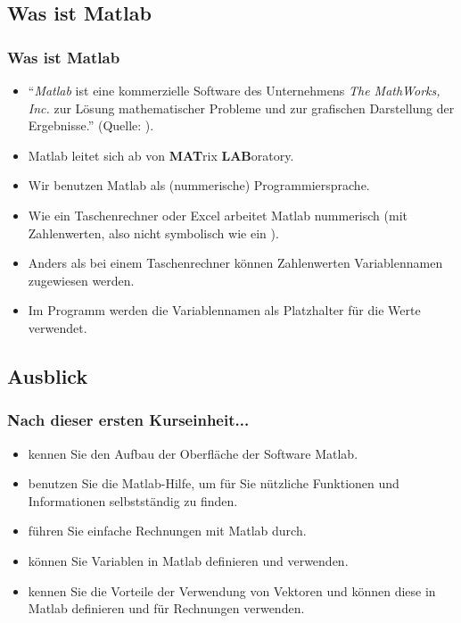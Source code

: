     \subsection{Was ist Matlab}
    \begin{frame}
        \frametitle{Was ist Matlab}

        \begin{itemize}
          \item ``\emph{Matlab} ist eine kommerzielle Software des Unternehmens \emph{The MathWorks, Inc.} zur Lösung mathematischer Probleme
          und zur grafischen Darstellung der Ergebnisse.'' (Quelle: ).
          \item Matlab leitet sich ab von \textbf{MAT}rix \textbf{LAB}oratory.
          \item Wir benutzen Matlab als (nummerische) Programmiersprache.
          \item Wie ein Taschenrechner oder Excel arbeitet Matlab nummerisch (mit Zahlenwerten, also nicht symbolisch wie
          ein ).
          \item Anders als bei einem Taschenrechner können Zahlenwerten Variablennamen zugewiesen werden.
          \item Im Programm werden die Variablennamen als Platzhalter für die Werte verwendet.
        \end{itemize}
    \end{frame}

    \subsection{Ausblick}
    \begin{frame}
        \frametitle{Nach dieser ersten Kurseinheit...}

        \begin{itemize}
          \itemsep0.3cm
          \item kennen Sie den Aufbau der Oberfläche der Software Matlab.
          \item benutzen Sie die Matlab-Hilfe, um für Sie nützliche Funktionen und Informationen selbstständig zu finden.
          \item führen Sie einfache Rechnungen mit Matlab durch.
          \item können Sie Variablen in Matlab definieren und verwenden.
          \item kennen Sie die Vorteile der Verwendung von Vektoren und können diese in Matlab definieren und für Rechnungen verwenden.
        \end{itemize}
    \end{frame}

